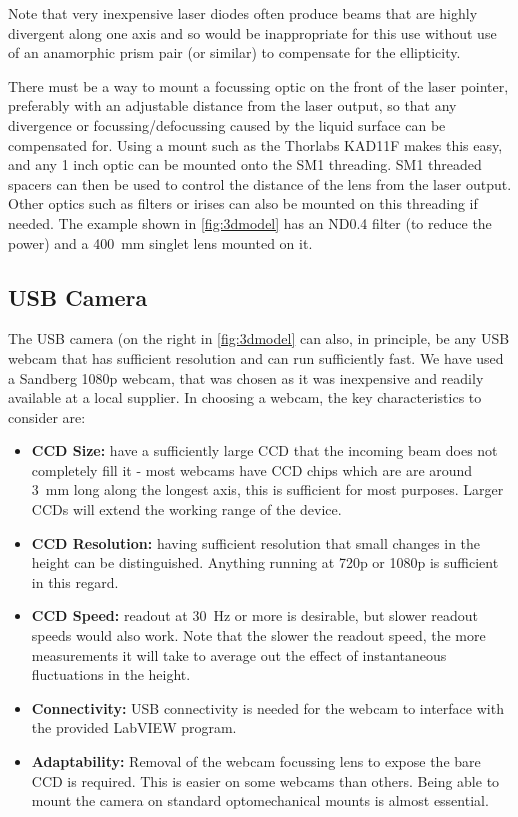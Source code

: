 \documentclass[11pt,a4paper,twoside]{article}
\begin{document}
Note that very inexpensive laser diodes often produce beams that are highly divergent along one axis and so would be inappropriate for this use without use of an anamorphic prism pair (or similar) to compensate for the ellipticity. 

There must be a way to mount a focussing optic on the front of the laser pointer, preferably with an adjustable distance from the laser output, so that any divergence or focussing/defocussing caused by the liquid surface can be compensated for. Using a mount such as the Thorlabs KAD11F makes this easy, and any 1 inch optic can be mounted onto the SM1 threading. SM1 threaded spacers can then be used to control the distance of the lens from the laser output. Other optics such as filters or irises can also be mounted on this threading if needed. The example shown in \autoref{fig:3dmodel} has an ND0.4 filter (to reduce the power) and a \SI{400}{\milli\metre} singlet lens mounted on it. 

\subsection{USB Camera}
The USB camera (on the right in \autoref{fig:3dmodel} can also, in principle, be any USB webcam that has sufficient resolution and can run sufficiently fast. We have used a Sandberg 1080p webcam, that was chosen as it was inexpensive and readily available at a local supplier. In choosing a webcam, the key characteristics to consider are:
\begin{itemize}
\item \textbf{CCD Size:} have a sufficiently large CCD that the incoming beam does not completely fill it - most webcams have CCD chips which are are around \SI{3}{\milli\metre} long along the longest axis, this is sufficient for most purposes. Larger CCDs will extend the working range of the device. 
\item \textbf{CCD Resolution:} having sufficient resolution that small changes in the height can be distinguished. Anything running at 720p or 1080p is sufficient in this regard. 
\item \textbf{CCD Speed:} readout at \SI{30}{\hertz} or more is desirable, but slower readout speeds would also work. Note that the slower the readout speed, the more measurements it will take to average out the effect of instantaneous fluctuations in the height.
\item \textbf{Connectivity:} USB connectivity is needed for the webcam to interface with the provided LabVIEW program.
\item \textbf{Adaptability:} Removal of the webcam focussing lens to expose the bare CCD is required. This is easier on some webcams than others. Being able to mount the camera on standard optomechanical mounts is almost essential.
\end{itemize}
\end{document}
